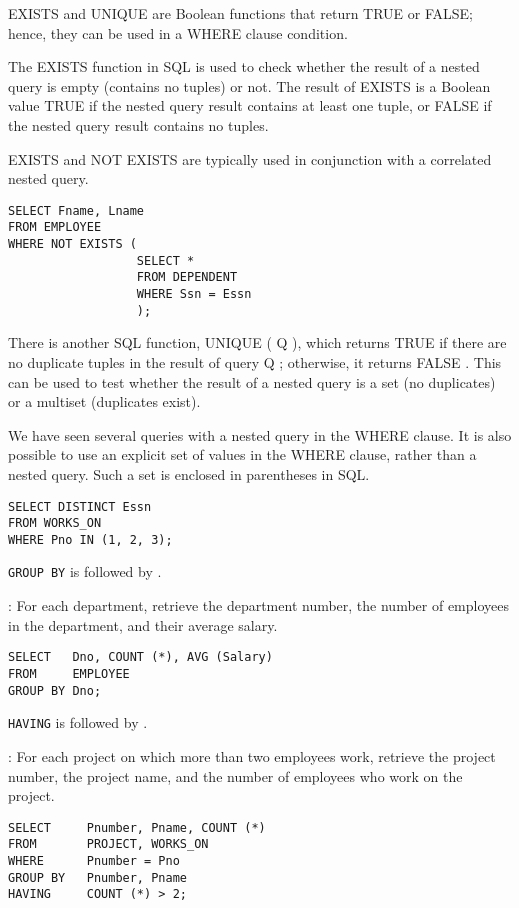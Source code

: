    \par EXISTS and UNIQUE are Boolean functions that return TRUE or FALSE; hence, they can be used in a WHERE clause condition.
    \par The EXISTS function in SQL is used to check whether the result of a nested query is empty (contains no tuples) or not. The result of EXISTS is a Boolean value TRUE if the nested query result contains at least one tuple, or FALSE if the nested query result contains no tuples.
    \par EXISTS and NOT EXISTS are typically used in conjunction with a correlated nested
query.
      \begin{verbatim}
SELECT Fname, Lname
FROM EMPLOYEE
WHERE NOT EXISTS (
                  SELECT *
                  FROM DEPENDENT
                  WHERE Ssn = Essn
                  );
      \end{verbatim}
\par There is another SQL function, UNIQUE ( Q ), which returns TRUE if there are no
duplicate tuples in the result of query Q ; otherwise, it returns FALSE . This can be
used to test whether the result of a nested query is a set (no duplicates) or a multiset
(duplicates exist).

\par We have seen several queries with a nested query in the WHERE clause. It is also possible to use an explicit set of values in the WHERE clause, rather than a nested query. Such a set is enclosed in parentheses in SQL.

\begin{verbatim}
SELECT DISTINCT Essn
FROM WORKS_ON
WHERE Pno IN (1, 2, 3);
\end{verbatim}

    \par \lstinline{GROUP BY} is followed by .
    \par {}: For each department, retrieve the department number, the number of employees in the department, and their average salary.
    \begin{verbatim}
SELECT   Dno, COUNT (*), AVG (Salary)
FROM     EMPLOYEE
GROUP BY Dno;
    \end{verbatim}

  \par \lstinline{HAVING} is followed by .
  \par {}: For each project on which more than two employees work, retrieve the project number, the project name, and the number of employees who work on the project.
    \begin{verbatim}
SELECT     Pnumber, Pname, COUNT (*)
FROM       PROJECT, WORKS_ON
WHERE      Pnumber = Pno
GROUP BY   Pnumber, Pname
HAVING     COUNT (*) > 2;
    \end{verbatim}


